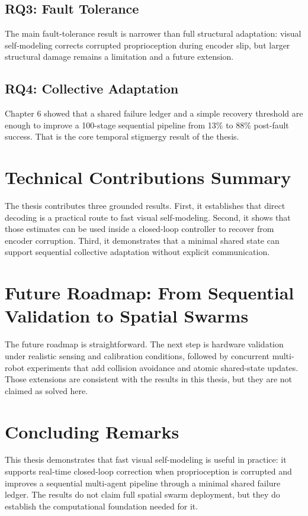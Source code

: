 \documentclass[12pt,a4paper,oneside]{report}
\begin{document}
\subsection{RQ3: Fault Tolerance}

The main fault-tolerance result is narrower than full structural adaptation: visual self-modeling corrects corrupted proprioception during encoder slip, but larger structural damage remains a limitation and a future extension.

\subsection{RQ4: Collective Adaptation}

Chapter 6 showed that a shared failure ledger and a simple recovery threshold are enough to improve a 100-stage sequential pipeline from 13\% to 88\% post-fault success. That is the core temporal stigmergy result of the thesis.

\section{Technical Contributions Summary}

The thesis contributes three grounded results. First, it establishes that direct decoding is a practical route to fast visual self-modeling. Second, it shows that those estimates can be used inside a closed-loop controller to recover from encoder corruption. Third, it demonstrates that a minimal shared state can support sequential collective adaptation without explicit communication.

\section{Future Roadmap: From Sequential Validation to Spatial Swarms}

The future roadmap is straightforward. The next step is hardware validation under realistic sensing and calibration conditions, followed by concurrent multi-robot experiments that add collision avoidance and atomic shared-state updates. Those extensions are consistent with the results in this thesis, but they are not claimed as solved here.

\section{Concluding Remarks}

This thesis demonstrates that fast visual self-modeling is useful in practice: it supports real-time closed-loop correction when proprioception is corrupted and improves a sequential multi-agent pipeline through a minimal shared failure ledger. The results do not claim full spatial swarm deployment, but they do establish the computational foundation needed for it.
\end{document}
